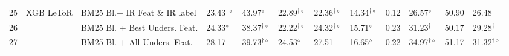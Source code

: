 \begin{table}
{\begin{tabular}{ccllllllllll}
\midrule 
25 & \multirow{3}{*}{XGB LeToR} & BM25 Bl.+ IR Feat \& IR label  & 23.43$^{\dagger\diamond}$  & 43.97$^{\diamond}$  & 22.89$^{\dagger\diamond}$  & 22.36$^{\dagger\diamond}$  & 14.34$^{\dagger\diamond}$  & 0.12  & 26.57$^{\diamond}$  & 50.90  & 26.48\tabularnewline
26  &  & BM25 Bl. + Best Unders. Feat.  & 24.33$^{\diamond}$  & 38.37$^{\dagger\diamond}$  & 22.22$^{\dagger\diamond}$  & 24.32$^{\dagger\diamond}$  & 15.71$^{\diamond}$  & 0.23  & 31.23$^{\dagger}$  & 50.17  & 29.28$^{\dagger}$ \tabularnewline
27  &  & BM25 Bl. + All Unders. Feat.  & 28.17  & 39.73$^{\dagger\diamond}$  & 24.53$^{\diamond}$  & 27.51  & 16.65$^{\diamond}$  & 0.22  & 34.97$^{\dagger\diamond}$  & 51.17  & 31.32$^{\dagger\diamond}$ \tabularnewline
\bottomrule
\end{tabular}} %
\end{table}

